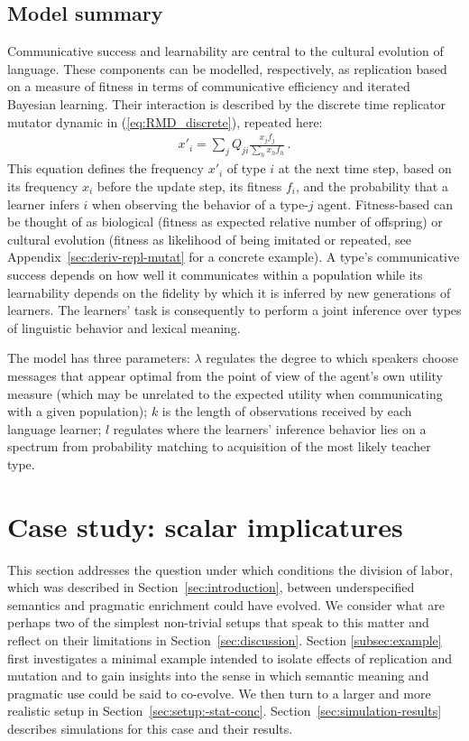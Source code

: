 \documentclass[a4paper, 11pt]{article}
\theoremstyle{Satz}
\begin{document}
\subsection{Model summary}

Communicative success and learnability are central to the cultural evolution of language. These
components can be modelled, respectively, as replication based on a measure of fitness in terms
of communicative efficiency and iterated Bayesian learning. Their interaction is described by
the discrete time replicator mutator dynamic in (\ref{eq:RMD_discrete}), repeated here:
\begin{align*}
  x'_i = \sum_j Q_{ji} \frac{x_jf_j}{\sum_h x_h f_h}\,.
\end{align*}
This equation defines the frequency $x'_i$ of type $i$ at the next time step, based on its
frequency $x_i$ before the update step, its fitness $f_i$, and the probability that a learner
infers $i$ when observing the behavior of a type-$j$ agent. Fitness-based can be thought of as
biological (fitness as expected relative number of offspring) or cultural evolution (fitness as
likelihood of being imitated or repeated, see Appendix~\ref{sec:deriv-repl-mutat} for a
concrete example). A type's communicative success depends on how well it communicates within a
population while its learnability depends on the fidelity by which it is inferred by new
generations of learners. The learners' task is consequently to perform a joint inference over
types of linguistic behavior and lexical meaning.

The model has three parameters: $\lambda$ regulates the degree to which speakers
choose messages that appear optimal from the point of view of the agent's own utility measure
(which may be unrelated to the expected utility when communicating with a given population);
$k$ is the length of observations received by each language learner; $l$ regulates where the learners'
inference behavior lies on a spectrum from probability matching to acquisition of the most likely
teacher type.





\section{Case study: scalar implicatures}
\label{sec:si-case-study}

This section addresses the question under which conditions the division of labor, which was
described in Section~\ref{sec:introduction}, between underspecified semantics and pragmatic
enrichment could have evolved. We consider what are perhaps two of the simplest non-trivial
setups that speak to this matter and reflect on their limitations in
Section~\ref{sec:discussion}. Section \ref{subsec:example} first investigates a minimal example
intended to isolate effects of replication and mutation and to gain insights into the sense in
which semantic meaning and pragmatic use could be said to co-evolve. We then turn to a larger and
more realistic setup in
Section~\ref{sec:setup:-stat-conc}. Section~\ref{sec:simulation-results} describes simulations
for this case and their results.
\end{document}

